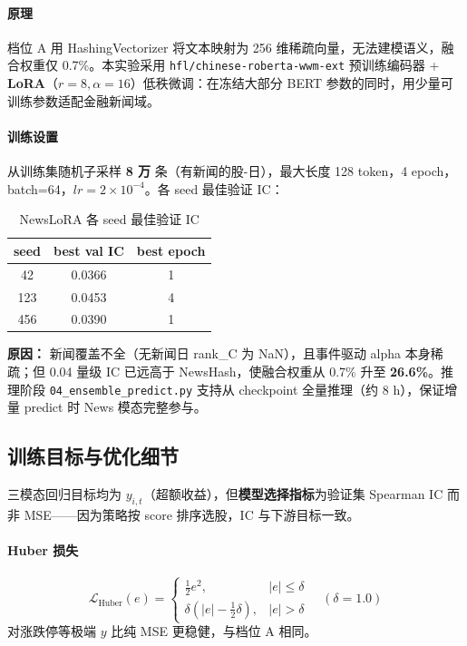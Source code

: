 \documentclass[UTF8,a4paper,12pt]{ctexart}
\begin{document}
\paragraph{原理}

档位 A 用 HashingVectorizer 将文本映射为 256 维稀疏向量，无法建模语义，融合权重仅 0.7\%。本实验采用 \texttt{hfl/chinese-roberta-wwm-ext} 预训练编码器 + \textbf{LoRA}（$r=8, \alpha=16$）低秩微调：在冻结大部分 BERT 参数的同时，用少量可训练参数适配金融新闻域。

\paragraph{训练设置}

从训练集随机子采样 \textbf{8 万} 条（有新闻的股-日），最大长度 128 token，4 epoch，batch=64，$lr=2\times10^{-4}$。各 seed 最佳验证 IC：

\begin{table}[H]
\centering
\caption{NewsLoRA 各 seed 最佳验证 IC}
\label{tab:news-seed}
\begin{tabular}{ccc}
\toprule
\textbf{seed} & \textbf{best val IC} & \textbf{best epoch} \\
\midrule
42  & 0.0366 & 1 \\
123 & 0.0453 & 4 \\
456 & 0.0390 & 1 \\
\bottomrule
\end{tabular}
\end{table}

\textbf{原因：} 新闻覆盖不全（无新闻日 rank\_C 为 NaN），且事件驱动 alpha 本身稀疏；但 0.04 量级 IC 已远高于 NewsHash，使融合权重从 0.7\% 升至 \textbf{26.6\%}。推理阶段 \texttt{04\_ensemble\_predict.py} 支持从 checkpoint 全量推理（约 8 h），保证增量 predict 时 News 模态完整参与。

\subsection{训练目标与优化细节}

三模态回归目标均为 $y_{i,t}$（超额收益），但\textbf{模型选择指标}为验证集 Spearman IC 而非 MSE——因为策略按 score 排序选股，IC 与下游目标一致。

\paragraph{Huber 损失}

\begin{equation}
  \mathcal{L}_{\mathrm{Huber}}(e) =
  \begin{cases}
    \frac{1}{2}e^2, & |e| \le \delta \\
    \delta(|e| - \frac{1}{2}\delta), & |e| > \delta
  \end{cases}
  \quad (\delta=1.0)
\end{equation}
对涨跌停等极端 $y$ 比纯 MSE 更稳健，与档位 A 相同。
\end{document}
